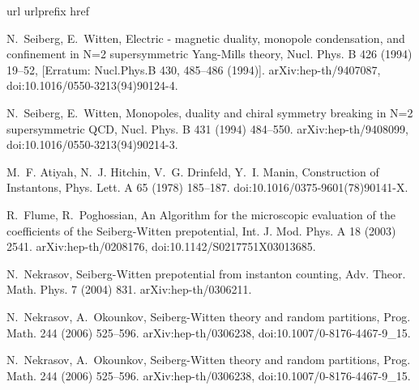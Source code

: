 \documentclass[11pt,a4paper]{elsarticle}
\numberwithin{figure}{section}
\numberwithin{table}{section}
\begin{document}
\begin{thebibliography}{10}
\expandafter\ifx\csname url\endcsname\relax
  \def\url#1{\texttt{#1}}\fi
\expandafter\ifx\csname urlprefix\endcsname\relax\def\urlprefix{URL }\fi
\expandafter\ifx\csname href\endcsname\relax
  \def\href#1#2{#2} \def\path#1{#1}\fi

N.~Seiberg, E.~Witten, {Electric - magnetic duality, monopole condensation, and
  confinement in N=2 supersymmetric Yang-Mills theory}, Nucl. Phys. B 426
  (1994) 19--52, [Erratum: Nucl.Phys.B 430, 485--486 (1994)].
\newblock \href {http://arxiv.org/abs/hep-th/9407087}
  {\path{arXiv:hep-th/9407087}}, \href
  {https://doi.org/10.1016/0550-3213(94)90124-4}
  {\path{doi:10.1016/0550-3213(94)90124-4}}.

N.~Seiberg, E.~Witten, {Monopoles, duality and chiral symmetry breaking in N=2
  supersymmetric QCD}, Nucl. Phys. B 431 (1994) 484--550.
\newblock \href {http://arxiv.org/abs/hep-th/9408099}
  {\path{arXiv:hep-th/9408099}}, \href
  {https://doi.org/10.1016/0550-3213(94)90214-3}
  {\path{doi:10.1016/0550-3213(94)90214-3}}.

M.~F. Atiyah, N.~J. Hitchin, V.~G. Drinfeld, Y.~I. Manin, {Construction of
  Instantons}, Phys. Lett. A 65 (1978) 185--187.
\newblock \href {https://doi.org/10.1016/0375-9601(78)90141-X}
  {\path{doi:10.1016/0375-9601(78)90141-X}}.

R.~Flume, R.~Poghossian, {An Algorithm for the microscopic evaluation of the
  coefficients of the Seiberg-Witten prepotential}, Int. J. Mod. Phys. A 18
  (2003) 2541.
\newblock \href {http://arxiv.org/abs/hep-th/0208176}
  {\path{arXiv:hep-th/0208176}}, \href
  {https://doi.org/10.1142/S0217751X03013685}
  {\path{doi:10.1142/S0217751X03013685}}.

N.~Nekrasov, {Seiberg-Witten prepotential from instanton counting}, Adv. Theor.
  Math. Phys. 7 (2004) 831.
\newblock \href {http://arxiv.org/abs/hep-th/0306211}
  {\path{arXiv:hep-th/0306211}}.

N.~Nekrasov, A.~Okounkov, {Seiberg-Witten theory and random partitions}, Prog.
  Math. 244 (2006) 525--596.
\newblock \href {http://arxiv.org/abs/hep-th/0306238}
  {\path{arXiv:hep-th/0306238}}, \href
  {https://doi.org/10.1007/0-8176-4467-9_15}
  {\path{doi:10.1007/0-8176-4467-9_15}}.

N.~Nekrasov, A.~Okounkov, {Seiberg-Witten theory and random partitions}, Prog.
  Math. 244 (2006) 525--596.
\newblock \href {http://arxiv.org/abs/hep-th/0306238}
  {\path{arXiv:hep-th/0306238}}, \href
  {https://doi.org/10.1007/0-8176-4467-9_15}
  {\path{doi:10.1007/0-8176-4467-9_15}}.


\end{thebibliography}
\end{document}
